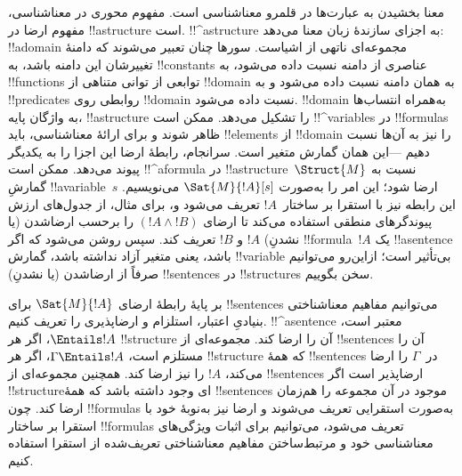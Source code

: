 \documentclass[../../../include/open-logic-section]{subfiles}
\begin{document}


معنا بخشیدن به عبارت‌ها در قلمرو معناشناسی است. مفهوم محوری در
معناشناسی، مفهوم ارضا در !!a{structure} است. !!^a{structure} به
اجزای سازندهٔ زبان معنا می‌دهد: !!a{domain} مجموعه‌ای ناتهی از اشیاست.
سورها چنان تعبیر می‌شوند که دامنهٔ تغییرشان این دامنه باشد، به
!!{constant}s عناصری از دامنه نسبت داده می‌شود، به !!{function}s
توابعی از توانی متناهی از !!{domain} به همان دامنه نسبت داده می‌شود و
به !!{predicate}s روابطی روی !!{domain} نسبت داده می‌شود. !!{domain}
به‌همراه انتساب‌ها به واژگان پایه، !!a{structure} را تشکیل می‌دهد.
ممکن است !!^{variable}s در !!{formula}s ظاهر شوند و برای ارائهٔ
معناشناسی، باید !!{element}s از !!{domain} را نیز به آن‌ها نسبت دهیم
---این همان گمارش متغیر است. سرانجام، رابطهٔ ارضا این اجزا را به یکدیگر
پیوند می‌دهد. ممکن است !!^a{formula} در !!a{structure}~$\Struct{M}$
نسبت به گمارشِ !!a{variable}~$s$ ارضا شود؛ این امر را به‌صورت
$\Sat{M}{!A}[s]$ می‌نویسیم. این رابطه نیز با استقرا بر ساختار~$!A$
تعریف می‌شود و، برای مثال، از جدول‌های ارزش پیوندگرهای منطقی استفاده
می‌کند تا ارضای $(!A \land !B)$ را برحسب ارضاشدن (یا نشدنِ) $!A$ و
$!B$ تعریف کند. سپس روشن می‌شود که اگر !!{formula}~$!A$ یک
!!a{sentence} باشد، یعنی متغیر آزاد نداشته باشد، گمارش !!{variable}
بی‌تأثیر است؛ ازاین‌رو می‌توانیم صرفاً از ارضاشدن (یا نشدنِ)
!!{sentence}s در !!{structure}s سخن بگوییم.

بر پایهٔ رابطهٔ ارضای $\Sat{M}{!A}$ برای !!{sentence}s می‌توانیم
مفاهیم معناشناختی بنیادیِ اعتبار، استلزام و ارضاپذیری را تعریف کنیم.
!!^a{sentence} معتبر است، $\Entails !A$، اگر هر !!{structure} آن را
ارضا کند. مجموعه‌ای از !!{sentence}s آن را مستلزم است،
$\Gamma \Entails !A$، اگر هر !!{structure} که همهٔ !!{sentence}s
در~$\Gamma$ را ارضا می‌کند، $!A$ را نیز ارضا کند. همچنین مجموعه‌ای از
!!{sentence}s ارضاپذیر است اگر !!{structure}ای وجود داشته باشد که
همهٔ !!{sentence}s موجود در آن مجموعه را هم‌زمان ارضا کند. چون
!!{formula}s به‌صورت استقرایی تعریف می‌شوند و ارضا نیز به‌نوبهٔ خود
با استقرا بر ساختار !!{formula}s تعریف می‌شود، می‌توانیم برای اثبات
ویژگی‌های معناشناسی خود و مرتبط‌ساختن مفاهیم معناشناختی تعریف‌شده از
استقرا استفاده کنیم.
\end{document}
